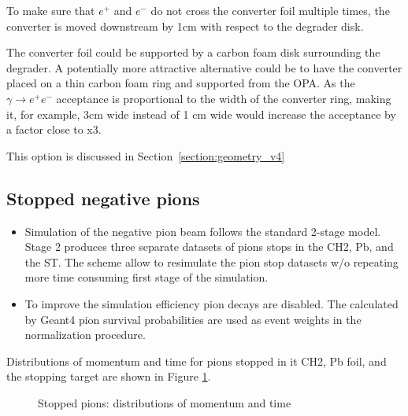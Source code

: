 To make sure that $e^+$ and $e^-$ do not cross the converter foil multiple times,
the converter is moved downstream by 1cm with respect to the degrader disk.

The converter foil could be supported by a carbon foam disk surrounding the degrader.
A potentially more attractive alternative could be to have the converter placed
on a thin carbon foam ring and supported from the OPA. 
As the $\gamma \to e^+e^-$ acceptance is proportional to the width of the converter ring,
making it, for example, 3cm wide instead of 1 cm wide would increase the acceptance
by a factor close to x3.

This option is discussed in Section~\ref{section:geometry_v4}


\subsection{Stopped negative pions}

\begin{itemize}
\item 
  Simulation of the negative pion beam follows the standard 2-stage model.
  Stage 2 produces three separate datasets of pions stops in the CH2, Pb, and the ST.
  The scheme allow to resimulate the pion stop datasets w/o repeating more time consuming
  first stage of the simulation.
\item
  To improve the simulation efficiency pion decays are disabled. The calculated by Geant4
  pion survival probabilities are used as event weights in the normalization procedure.
\end{itemize}

Distributions of momentum and time for pions stopped in it CH2, Pb foil, and the
stopping target are shown in Figure \ref{figure:stopped_pim_mom_time}.

\begin{figure}[H]
  \caption{
    \label{figure:stopped_pim_mom_time}
    Stopped pions: distributions of momentum and time
  }
\end{figure}

